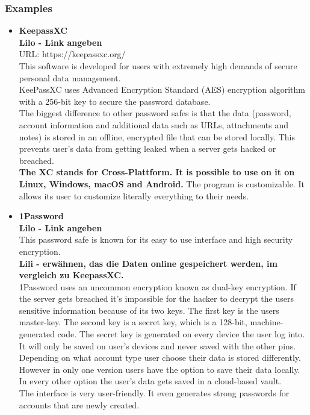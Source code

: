 \documentclass[conference]{IEEEtran}
\begin{document}
\subsubsection{Examples}
\begin{itemize}
\item \textbf{KeepassXC}\cite{b1}\\ \textbf{Lilo - Link angeben}\\
URL: https://keepassxc.org/\\
This software is developed for users with extremely high demands of secure personal data management. \\
KeePassXC uses Advanced Encryption Standard (AES) encryption algorithm with a 256-bit key to secure the password database.\\
The biggest difference to other password safes is that the data (password, account information and additional data such as URLs, attachments and notes) is stored in an offline, encrypted file that can be stored locally. This prevents user's data from getting leaked when a server gets hacked or breached.\\
\textbf{The XC stands for Cross-Plattform. It is possible to use on it on Linux, Windows, macOS and Android.}
The program is customizable. It allows its user to customize literally everything to their needs.\\

\item \textbf{1Password}\\ \textbf{Lilo - Link angeben}\\
This password safe is known for its easy to use interface and high security encryption.\\ \textbf{Lili - erwähnen, das die Daten online gespeichert werden, im vergleich zu KeepassXC.}\\
1Password uses an uncommon encryption known as dual-key encryption. If the server gets breached it's impossible for the hacker to decrypt the users sensitive information because of its two keys. The first key is the users master-key. The second key is a secret key, which is a 128-bit, machine-generated code. The secret key is generated on every device the user log into. It will only be saved on user's devices and never saved with the other pins.\\
Depending on what account type user choose their data is stored differently. However in only one version users have the option to save their data locally. In every other option the user's data gets saved in a cloud-based vault.\\
The interface is very user-friendly. It even generates strong passwords for accounts that are newly created.

\end{itemize}
\end{document}
